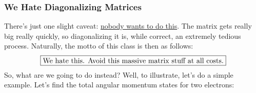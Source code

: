             \subsubsection{We Hate Diagonalizing Matrices}
                There's just one slight caveat: \underline{nobody wants to do this}. The matrix gets really big really quickly, so diagonalizing it is, while correct, an extremely tedious process. Naturally, the motto of this class is then as follows:
                $$\fbox{We hate this. Avoid this massive matrix stuff at all costs.}$$
                So, what are we going to do instead? Well, to illustrate, let's do a simple example. Let's find the total angular momentum states for two electrons:
